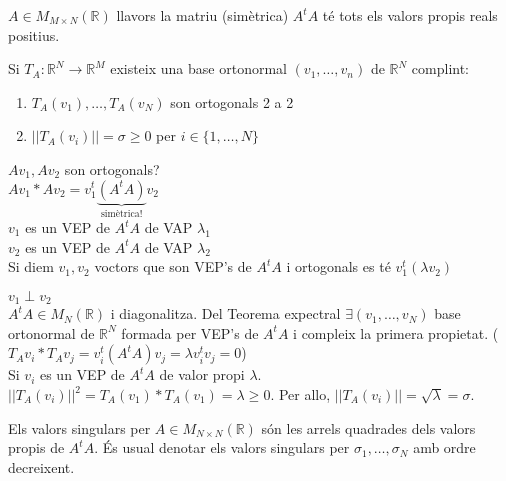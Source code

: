 \documentclass[../main.tex]{subfiles}
\begin{document}
    \begin{corolari}
        $A \in M_{M\times N}(\mathbb{R})$ llavors la matriu (simètrica) $A^tA$ té tots els valors propis reals positius.
    \end{corolari}
    \begin{teorema}
        Si $T_A: \mathbb{R}^N \rightarrow \mathbb{R}^M$ existeix una base ortonormal $(v_1, \dots, v_n)$ de $\mathbb{R}^N$ complint:
        \begin{enumerate}
            \item $T_A(v_1), \dots, T_A(v_N)$ son ortogonals 2 a 2
            \item $||T_A(v_i)|| = \sigma \geq 0$ per $i \in \{1, \dots, N\}$
        \end{enumerate}
    \end{teorema}
    \begin{obs}
        $Av_1, Av_2$ son ortogonals?\\
        $Av_1*Av_2 = v_1^t \underbrace{(A^tA)}_\text{simètrica!} v_2$\\
        $v_1$ es un VEP de $A^tA$ de VAP $\lambda_1$\\
        $v_2$ es un VEP de $A^tA$ de VAP $\lambda_2$\\
        Si diem $v_1, v_2$ voctors que son VEP's de $A^tA$ i ortogonals es té $v_1^t(\lambda v_2)$
    \end{obs}
    \begin{obs}
        $v_1 \perp v_2$\\
        $A^tA \in M_{N}(\mathbb{R})$ i diagonalitza. Del Teorema expectral $\exists (v_1, \dots, v_N)$ base ortonormal de $\mathbb{R}^N$ formada per VEP's de $A^tA$ i compleix la primera propietat. ($T_A v_i * T_A v_j = v_i^t(A^tA) v_j = \lambda v_i^t v_j = 0$)\\
        Si $v_i$ es un VEP de $A^tA$ de valor propi $\lambda$. $||T_A(v_i)||^2 = T_A(v_1) * T_A(v_1) = \lambda \geq 0$. Per allo, $||T_A(v_i)|| = \sqrt{\lambda} = \sigma$.
    \end{obs}
    \begin{definicio}
        Els valors singulars per $A \in M_{N \times N}(\mathbb{R})$ són les arrels quadrades dels valors propis de $A^t A$. És usual denotar els valors singulars per $\sigma_1, \dots, \sigma_N$ amb ordre decreixent.
    \end{definicio}
\end{document}
